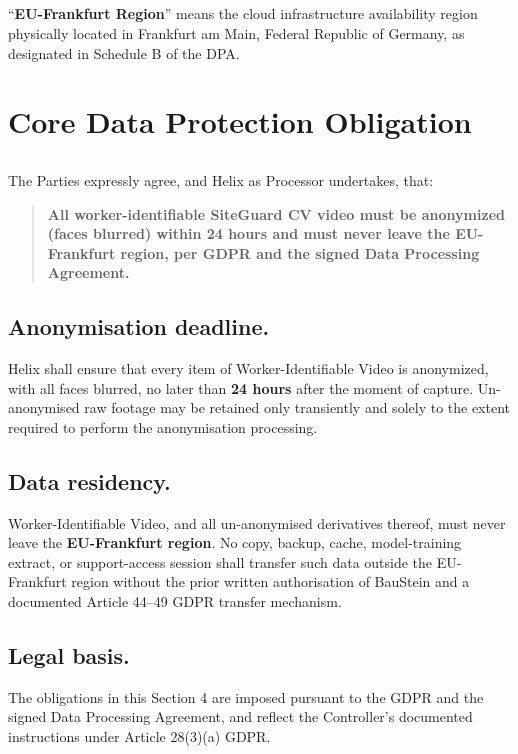\documentclass[11pt]{article}
\begin{document}
\subsection{} ``\textbf{EU-Frankfurt Region}'' means the cloud infrastructure availability region physically located in Frankfurt am Main, Federal Republic of Germany, as designated in Schedule B of the DPA.

\section{Core Data Protection Obligation}

\subsection{} The Parties expressly agree, and Helix as Processor undertakes, that:

\begin{quote}
\textbf{All worker-identifiable SiteGuard CV video must be anonymized (faces blurred) within 24 hours and must never leave the EU-Frankfurt region, per GDPR and the signed Data Processing Agreement.}
\end{quote}

\subsection{Anonymisation deadline.} Helix shall ensure that every item of Worker-Identifiable Video is anonymized, with all faces blurred, no later than \textbf{24 hours} after the moment of capture. Un-anonymised raw footage may be retained only transiently and solely to the extent required to perform the anonymisation processing.

\subsection{Data residency.} Worker-Identifiable Video, and all un-anonymised derivatives thereof, must never leave the \textbf{EU-Frankfurt region}. No copy, backup, cache, model-training extract, or support-access session shall transfer such data outside the EU-Frankfurt region without the prior written authorisation of BauStein and a documented Article 44--49 GDPR transfer mechanism.

\subsection{Legal basis.} The obligations in this Section 4 are imposed pursuant to the GDPR and the signed Data Processing Agreement, and reflect the Controller's documented instructions under Article 28(3)(a) GDPR.
\end{document}
